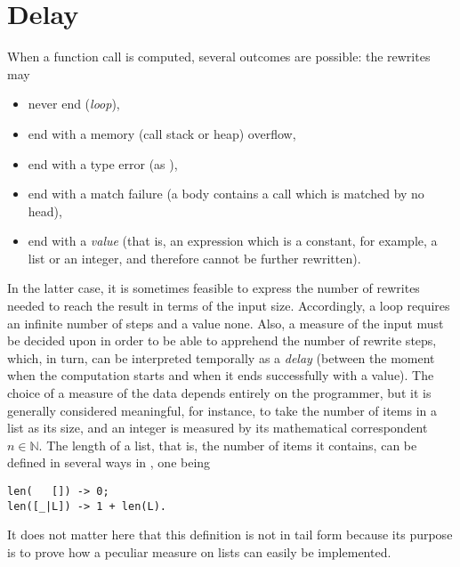 
\chapter{Delay}

When a function call is computed, several outcomes are possible: the
rewrites may
\begin{itemize}

  \item never end (\emph{loop}),

  \item end with a memory (call stack or heap) overflow,

  \item end with a type error (as ),

  \item end with a match failure (a body contains a call which is
  matched by no head),

  \item end with a \emph{value} (that is, an expression which is a
    constant, for example, a list or an integer, and therefore cannot
    be further rewritten).

\end{itemize}
In the latter case, it is sometimes feasible to express the number of
rewrites needed to reach the result in terms of the input
size. Accordingly, a loop requires an infinite number of steps and a
value none. Also, a measure of the input must be decided upon in order
to be able to apprehend the number of rewrite steps, which, in turn,
can be interpreted temporally as a \emph{delay} (between the moment
when the computation starts and when it ends successfully with a
value). The choice of a measure of the data depends entirely on the
programmer, but it is generally considered meaningful, for instance,
to take the number of items in a list as its size, and an \Erlang
integer  is measured by its mathematical correspondent \(n
\in \mathbb{N}\). The length of a list, that is, the number of items
it contains, can be defined in several ways in \Erlang, one being
\begin{verbatim}
len(   []) -> 0;
len([_|L]) -> 1 + len(L).
\end{verbatim}
It does not matter here that this definition is not in tail form
because its purpose is to prove how a peculiar measure on lists can
easily be implemented.

